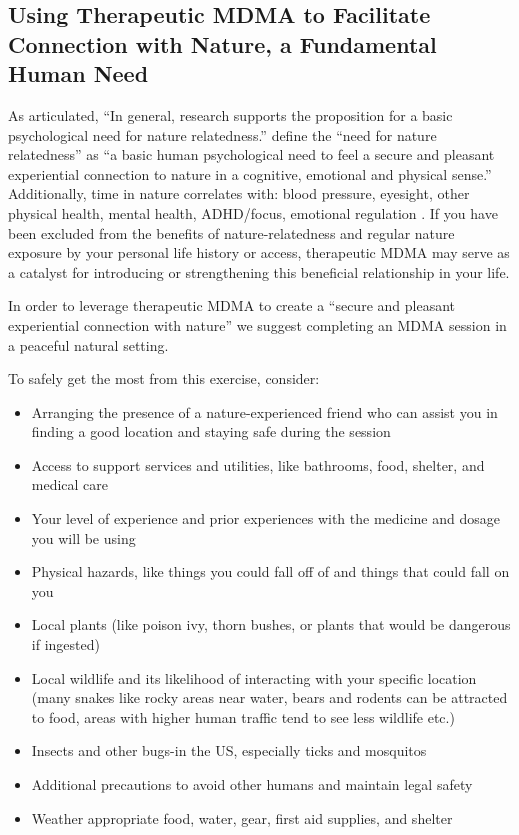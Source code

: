 \documentclass[12pt,letterpaper]{article}
\begin{document}
\subsection{Using Therapeutic MDMA to Facilitate Connection with Nature, a Fundamental Human Need}
As \textcite{baxterNatureRelatedness} articulated, “In general, research supports the proposition for a basic psychological need for nature relatedness.” \textcite{baxterNatureRelatedness} define the “need for nature relatedness” as “a basic human psychological need to feel a secure and pleasant experiential connection to nature in a cognitive, emotional and physical sense.” Additionally, time in nature correlates with: blood pressure, eyesight, other physical health, mental health, ADHD/focus, emotional regulation \cite{caoimheGreenspaceOutcomes} . If you have been excluded from the benefits of nature-relatedness and regular nature exposure by your personal life history or access, therapeutic MDMA may serve as a catalyst for introducing or strengthening this beneficial relationship in your life.

In order to leverage therapeutic MDMA to create a “secure and pleasant experiential connection with nature” we suggest completing an MDMA session in a peaceful natural setting.

To safely get the most from this exercise, consider:
\begin{itemize}
    \item Arranging the presence of a nature-experienced friend who can assist you in finding a good location and staying safe during the session
    \item Access to support services and utilities, like bathrooms, food, shelter, and medical care
    \item Your level of experience and prior experiences with the medicine and dosage you will be using
    \item Physical hazards, like things you could fall off of and things that could fall on you
    \item Local plants (like poison ivy, thorn bushes, or plants that would be dangerous if ingested)
    \item Local wildlife and its likelihood of interacting with your specific location (many snakes like rocky areas near water, bears and rodents can be attracted to food, areas with higher human traffic tend to see less wildlife etc.)
    \item Insects and other bugs-in the US, especially ticks and mosquitos
    \item Additional precautions to avoid other humans and maintain legal safety
    \item Weather appropriate food, water, gear, first aid supplies, and shelter
\end{itemize}
\end{document}
